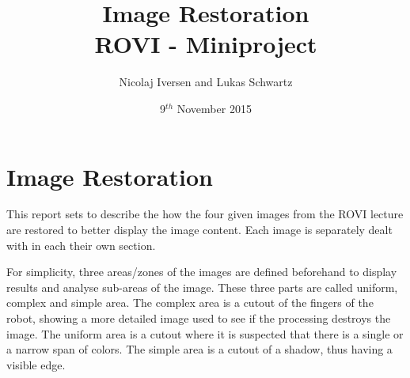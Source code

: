 \documentclass[12pt,a4paper,conference]{IEEEtran}
\begin{document}
\raggedbottom

\title{Image Restoration\\ \large{ROVI - Miniproject}}
\author{Nicolaj Iversen and Lukas Schwartz}
\date{9$^{th}$ November 2015}

\maketitle

\section{Image Restoration}
This report sets to describe the how the four given images from the ROVI lecture are restored to better display the image content.
Each image is separately dealt with in each their own section.

For simplicity, three areas/zones of the images are defined beforehand to display results and analyse sub-areas of the image.
These three parts are called uniform, complex and simple area.
The complex area is a cutout of the fingers of the robot, showing a more detailed image used to see if the processing destroys the image.
The uniform area is a cutout where it is suspected that there is a single or a narrow span of colors.
The simple area is a cutout of a shadow, thus having a visible edge.










\end{document}
